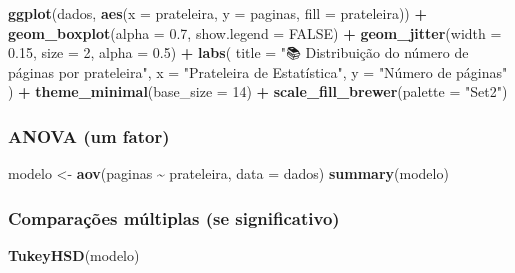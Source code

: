 \documentclass[
]{article}
\newenvironment{Shaded}{\begin{snugshade}}{\end{snugshade}}
\newcommand{\AttributeTok}[1]{\textcolor[rgb]{0.13,0.29,0.53}{#1}}
\newcommand{\ConstantTok}[1]{\textcolor[rgb]{0.56,0.35,0.01}{#1}}
\newcommand{\DecValTok}[1]{\textcolor[rgb]{0.00,0.00,0.81}{#1}}
\newcommand{\FloatTok}[1]{\textcolor[rgb]{0.00,0.00,0.81}{#1}}
\newcommand{\FunctionTok}[1]{\textcolor[rgb]{0.13,0.29,0.53}{\textbf{#1}}}
\newcommand{\NormalTok}[1]{#1}
\newcommand{\OtherTok}[1]{\textcolor[rgb]{0.56,0.35,0.01}{#1}}
\newcommand{\SpecialCharTok}[1]{\textcolor[rgb]{0.81,0.36,0.00}{\textbf{#1}}}
\newcommand{\StringTok}[1]{\textcolor[rgb]{0.31,0.60,0.02}{#1}}
\begin{document}
\begin{Shaded}
\begin{Highlighting}[]
\FunctionTok{ggplot}\NormalTok{(dados, }\FunctionTok{aes}\NormalTok{(}\AttributeTok{x =}\NormalTok{ prateleira, }\AttributeTok{y =}\NormalTok{ paginas, }\AttributeTok{fill =}\NormalTok{ prateleira)) }\SpecialCharTok{+}
  \FunctionTok{geom\_boxplot}\NormalTok{(}\AttributeTok{alpha =} \FloatTok{0.7}\NormalTok{, }\AttributeTok{show.legend =} \ConstantTok{FALSE}\NormalTok{) }\SpecialCharTok{+}
  \FunctionTok{geom\_jitter}\NormalTok{(}\AttributeTok{width =} \FloatTok{0.15}\NormalTok{, }\AttributeTok{size =} \DecValTok{2}\NormalTok{, }\AttributeTok{alpha =} \FloatTok{0.5}\NormalTok{) }\SpecialCharTok{+}
  \FunctionTok{labs}\NormalTok{(}
    \AttributeTok{title =} \StringTok{"📚 Distribuição do número de páginas por prateleira"}\NormalTok{,}
    \AttributeTok{x =} \StringTok{"Prateleira de Estatística"}\NormalTok{,}
    \AttributeTok{y =} \StringTok{"Número de páginas"}
\NormalTok{  ) }\SpecialCharTok{+}
  \FunctionTok{theme\_minimal}\NormalTok{(}\AttributeTok{base\_size =} \DecValTok{14}\NormalTok{) }\SpecialCharTok{+}
  \FunctionTok{scale\_fill\_brewer}\NormalTok{(}\AttributeTok{palette =} \StringTok{"Set2"}\NormalTok{)}
\end{Highlighting}
\end{Shaded}

\subsubsection{ANOVA (um fator)}\label{anova-um-fator}

\begin{Shaded}
\begin{Highlighting}[]
\NormalTok{modelo }\OtherTok{\textless{}{-}} \FunctionTok{aov}\NormalTok{(paginas }\SpecialCharTok{\textasciitilde{}}\NormalTok{ prateleira, }\AttributeTok{data =}\NormalTok{ dados)}
\FunctionTok{summary}\NormalTok{(modelo)}
\end{Highlighting}
\end{Shaded}

\subsubsection{Comparações múltiplas (se
significativo)}\label{comparauxe7uxf5es-muxfaltiplas-se-significativo}

\begin{Shaded}
\begin{Highlighting}[]
\FunctionTok{TukeyHSD}\NormalTok{(modelo)}
\end{Highlighting}
\end{Shaded}
\end{document}
